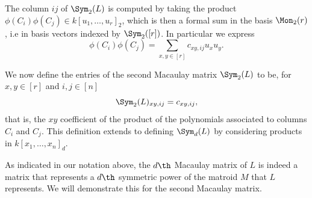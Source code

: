 The column $ij$ of $\Sym_2(L)$ is computed by taking the product $\phi(C_i)\phi(C_j)\in k[u_1,\dots,u_r]_2$, which is then a formal sum in the basis $\Mon_2(r)$, i.e in basis vectors indexed by $\Sym_2([r])$. In particular we express 
$$\phi(C_i)\phi(C_j)=\sum_{x,y\in[r]} c_{xy,ij}u_xu_y.$$

We now define the entries of the second Macaulay matrix $\Sym_2(L)$ to be, for $x,y\in [r]$ and $i,j\in[n]$
$$\Sym_2(L)_{xy,ij} = c_{xy,ij},$$
that is, the $xy$ coefficient of the product of the polynomials associated to columns $C_i$ and $C_j$. This definition extends to defining $\Sym_{d}(L)$ by considering products in $k[x_1,\dots,x_n]_d.$

As indicated in our notation above, the $d\th$ Macaulay matrix of $L$ is indeed a matrix that represents a $d\th$ symmetric power of the matroid $M$ that $L$ represents. We will demonstrate this for the second Macaulay matrix. 
